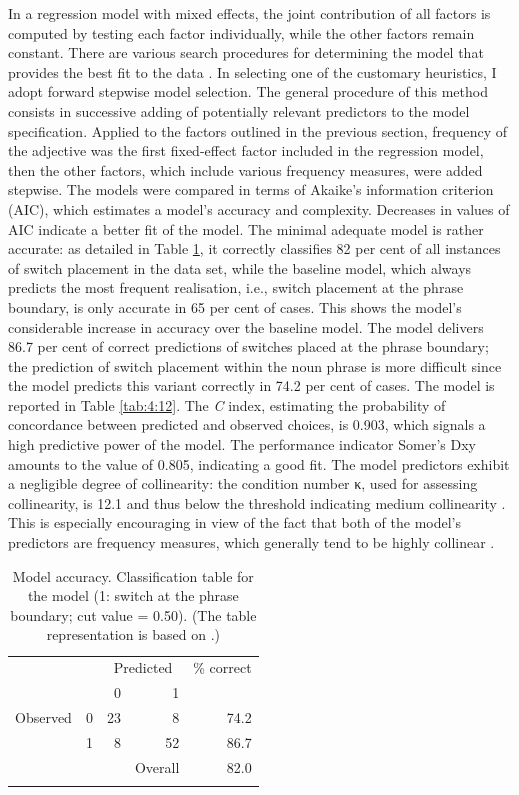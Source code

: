 In a regression model with mixed effects, the joint contribution of all factors is computed by testing each factor individually, while the other factors remain constant. There are various search procedures for determining the model that provides the best fit to the data \citep[cf.][]{baayen-2013}. In selecting one of the customary heuristics, I adopt forward stepwise model selection. The general procedure of this method consists in successive adding of potentially relevant predictors to the model specification. Applied to the factors outlined in the previous section, frequency of the adjective was the first fixed-effect factor included in the regression model, then the other factors, which include various frequency measures, were added stepwise. The models were compared in terms of Akaike's information criterion (AIC), which estimates a model's accuracy and complexity. Decreases in values of AIC indicate a better fit of the model. The minimal adequate model is rather accurate: as detailed in Table \ref{tab:4:11}, it correctly classifies 82 per cent of all instances of switch placement in the data set, while the baseline model, which always predicts the most frequent realisation, i.e., switch placement at the phrase boundary, is only accurate in 65 per cent of cases. This shows the model's considerable increase in accuracy over the baseline model. The model delivers 86.7 per cent of correct predictions of switches placed at the phrase boundary; the prediction of switch placement within the noun phrase is more difficult since the model predicts this variant correctly in 74.2 per cent of cases. The  model is reported in Table \ref{tab:4:12}. The \textit{C} index, estimating the probability of concordance between predicted and observed choices, is 0.903, which signals a high predictive power of the model. The performance indicator Somer's Dxy amounts to the value of 0.805, indicating a good fit. The model predictors exhibit a negligible degree of collinearity: the condition number κ, used for assessing collinearity, is 12.1 and thus below the threshold indicating medium collinearity \citep[cf.][182]{baayen-analyzing}. This is especially encouraging in view of the fact that both of the model's predictors are frequency measures, which generally tend to be highly collinear \citep{baayen-2013}.

\begin{table}
		\begin{tabular}{l *{4}{r}} 
		\lsptoprule
 			& & \multicolumn{2}{c}{Predicted} & \% correct\\\cmidrule(lr){3-4}
			  & &0 &1 &\\ \midrule
			Observed  & 0     &23   &8 &74.2\\
			 &1 &8 &52 &86.7\\
			 & & &Overall &82.0\\
			 \lspbottomrule
		\end{tabular}
\caption{Model accuracy. Classification table for the model (1: switch at the phrase boundary; cut value = 0.50). (The table representation is based on \citealt{bresnan-etal}.)\label{tab:4:11}}
\end{table}

